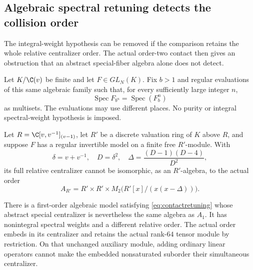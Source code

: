 \subsection{Algebraic spectral retuning detects the collision order}
The integral-weight hypothesis can be removed if the comparison
retains the whole relative centralizer order. The actual
order-two contact then gives an obstruction that an abstract
special-fiber algebra alone does not detect.

\begin{finding}\label{f:algebraiccontact}
Let $K/\C(v)$ be finite and let $F\in GL_N(K)$.
Fix $b>1$ and regular evaluations of this same algebraic
family such that, for every sufficiently large integer $n$,
\begin{equation}\label{eq:contactretuning}
 \operatorname{Spec}F_{b^n}
     =\operatorname{Spec}(F_b^n)
\end{equation}
as multisets. The evaluations may use different places.
No purity or integral spectral-weight hypothesis is imposed.

Let $R=\C[v,v^{-1}]_{(v-1)}$, let $R'$ be a discrete
valuation ring of $K$ above $R$, and suppose $F$ has
a regular invertible model on a finite free $R'$-module.
With
\[
 \delta=v+v^{-1},\quad D=\delta^2,\quad
 \Delta=\frac{(D-1)(D-4)}{D^2},
\]
its full relative centralizer cannot be isomorphic,
as an $R'$-algebra, to the actual order
\[
 A_{R'}=R'\times R'\times
 M_2\bigl(R'[x]/(x(x-\Delta))\bigr).
\]

There is a first-order algebraic model satisfying
\eqref{eq:contactretuning} whose abstract special
centralizer is nevertheless the same algebra as $A_1$.
It has nonintegral spectral weights and a different
relative order. The actual order embeds in its centralizer
and retains the actual rank-$64$ tensor module by restriction.
On that unchanged auxiliary module, adding ordinary linear
operators cannot make the embedded nonsaturated suborder
their simultaneous centralizer.
\end{finding}


